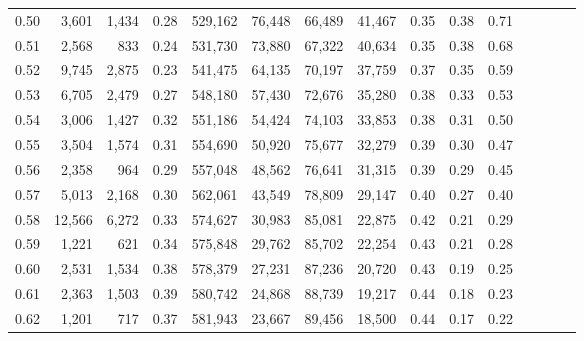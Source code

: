 \begin{tabular}{rrrcrrrrrrrrrrr}
0.50 &   3,601 &  1,434 &                                       0.28 &  529,162 &   76,448 &   66,489 &   41,467 &  0.35 &  0.38 &                         0.71 \\
0.51 &   2,568 &    833 &                                       0.24 &  531,730 &   73,880 &   67,322 &   40,634 &  0.35 &  0.38 &                         0.68 \\
0.52 &   9,745 &  2,875 &                                       0.23 &  541,475 &   64,135 &   70,197 &   37,759 &  0.37 &  0.35 &                         0.59 \\
0.53 &   6,705 &  2,479 &                                       0.27 &  548,180 &   57,430 &   72,676 &   35,280 &  0.38 &  0.33 &                         0.53 \\
0.54 &   3,006 &  1,427 &                                       0.32 &  551,186 &   54,424 &   74,103 &   33,853 &  0.38 &  0.31 &                         0.50 \\
0.55 &   3,504 &  1,574 &                                       0.31 &  554,690 &   50,920 &   75,677 &   32,279 &  0.39 &  0.30 &                         0.47 \\
0.56 &   2,358 &    964 &                                       0.29 &  557,048 &   48,562 &   76,641 &   31,315 &  0.39 &  0.29 &                         0.45 \\
0.57 &   5,013 &  2,168 &                                       0.30 &  562,061 &   43,549 &   78,809 &   29,147 &  0.40 &  0.27 &                         0.40 \\
0.58 &  12,566 &  6,272 &                                       0.33 &  574,627 &   30,983 &   85,081 &   22,875 &  0.42 &  0.21 &                         0.29 \\
0.59 &   1,221 &    621 &                                       0.34 &  575,848 &   29,762 &   85,702 &   22,254 &  0.43 &  0.21 &                         0.28 \\
0.60 &   2,531 &  1,534 &                                       0.38 &  578,379 &   27,231 &   87,236 &   20,720 &  0.43 &  0.19 &                         0.25 \\
0.61 &   2,363 &  1,503 &                                       0.39 &  580,742 &   24,868 &   88,739 &   19,217 &  0.44 &  0.18 &                         0.23 \\
0.62 &   1,201 &    717 &                                       0.37 &  581,943 &   23,667 &   89,456 &   18,500 &  0.44 &  0.17 &                         0.22 \\

\end{tabular}
